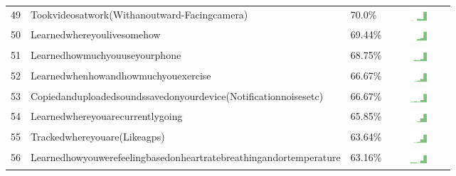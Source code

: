 \documentclass[a4paper,12pt]{article}
\begin{document}
\begin{longtable}{| p{0.5cm} | p{7cm} | p{1cm} | c |}
49 & Tookvideosatwork(Withanoutward-Facingcamera) & 70.0\% & \includegraphics[width = 2cm, height = 0.5cm]{tookvideosatwork(withanoutward-facingcamera)WORKCONTACTS} \\  
50 & Learnedwhereyoulivesomehow & 69.44\% & \includegraphics[width = 2cm, height = 0.5cm]{learnedwhereyoulivesomehowWORKCONTACTS} \\  
51 & Learnedhowmuchyouuseyourphone & 68.75\% & \includegraphics[width = 2cm, height = 0.5cm]{learnedhowmuchyouuseyourphoneWORKCONTACTS} \\  
52 & Learnedwhenhowandhowmuchyouexercise & 66.67\% & \includegraphics[width = 2cm, height = 0.5cm]{learnedwhenhowandhowmuchyouexerciseWORKCONTACTS} \\  
53 & Copiedanduploadedsoundssavedonyourdevice(Notificationnoisesetc) & 66.67\% & \includegraphics[width = 2cm, height = 0.5cm]{copiedanduploadedsoundssavedonyourdevice(notificationnoisesetc)WORKCONTACTS} \\  
54 & Learnedwhereyouarecurrentlygoing & 65.85\% & \includegraphics[width = 2cm, height = 0.5cm]{learnedwhereyouarecurrentlygoingWORKCONTACTS} \\  
55 & Trackedwhereyouare(Likeagps) & 63.64\% & \includegraphics[width = 2cm, height = 0.5cm]{trackedwhereyouare(likeaGPS)WORKCONTACTS} \\  
56 & Learnedhowyouwerefeelingbasedonheartratebreathingandortemperature & 63.16\% & \includegraphics[width = 2cm, height = 0.5cm]{learnedhowyouwerefeelingbasedonheartratebreathingandortemperatureWORKCONTACTS} \\  

\end{longtable}
\end{document}
